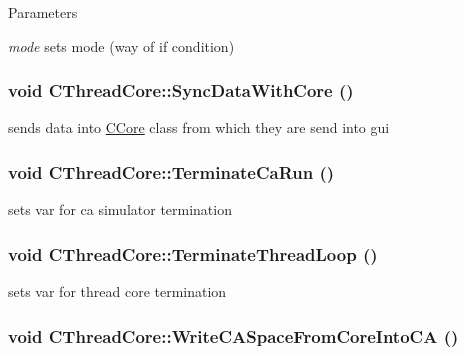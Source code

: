 \begin{DoxyParams}{Parameters}
\item[{\em mode}]sets mode (way of if condition) \end{DoxyParams}
\hypertarget{classCThreadCore_a4fff3c00394bcaffae4875a7fb28a335}{
\subsubsection[{SyncDataWithCore}]{\setlength{\rightskip}{0pt plus 5cm}void CThreadCore::SyncDataWithCore ()}}
\label{classCThreadCore_a4fff3c00394bcaffae4875a7fb28a335}
sends data into \hyperlink{classCCore}{CCore} class from which they are send into gui \hypertarget{classCThreadCore_ad44d9a6277ac3c02715b35eb44110c07}{
\subsubsection[{TerminateCaRun}]{\setlength{\rightskip}{0pt plus 5cm}void CThreadCore::TerminateCaRun ()}}
\label{classCThreadCore_ad44d9a6277ac3c02715b35eb44110c07}
sets var for ca simulator termination \hypertarget{classCThreadCore_a656208f8a0c3915d6786e317ba59184f}{
\subsubsection[{TerminateThreadLoop}]{\setlength{\rightskip}{0pt plus 5cm}void CThreadCore::TerminateThreadLoop ()}}
\label{classCThreadCore_a656208f8a0c3915d6786e317ba59184f}
sets var for thread core termination \hypertarget{classCThreadCore_af979f38a80787229941f03512e003c09}{
\subsubsection[{WriteCASpaceFromCoreIntoCA}]{\setlength{\rightskip}{0pt plus 5cm}void CThreadCore::WriteCASpaceFromCoreIntoCA ()}}
